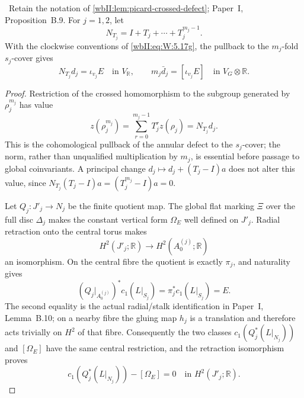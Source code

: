 \begin{lemma}
\label{wbII:lem:picard-finite-norm}
\ Retain the notation of
\cref{wbII:lem:picard-crossed-defect}; Paper~I, Proposition~B.9.  For
$j=1,2$, let
\[
 N_{T_j}=I+T_j+\cdots+T_j^{m_j-1}.
\]
With the clockwise conventions of \eqref{wbII:eq:W:5.17g}, the pullback to the
$m_j$-fold $s_j$-cover gives
\[
 N_{T_j}d_j=\iota_{v_j}E
 \quad\text{in }V_{\mathbb R},
\qquad
 m_j\bar d_j=[\iota_{v_j}E]
 \quad\text{in }V_G\otimes\mathbb R.
\tag{W.28}\label{wbII:eq:W:5.17k}
\]
\end{lemma}

\begin{proof}
Restriction of the crossed homomorphism to the subgroup generated by
$\rho_j^{m_j}$ has value
\[
 z(\rho_j^{m_j})
 =\sum_{r=0}^{m_j-1}T_j^rz(\rho_j)=N_{T_j}d_j.
\tag{W.29}\label{wbII:eq:W:5.17l}
\]
This is the cohomological pullback of the annular defect to the
$s_j$-cover; the norm, rather than unqualified multiplication by $m_j$, is
essential before passage to global coinvariants.  A principal change
$d_j\mapsto d_j+(T_j-I)a$ does not alter this value, since
$N_{T_j}(T_j-I)a=(T_j^{m_j}-I)a=0$.

Let $Q_j:J'_j\to N_j$ be the finite quotient map.  The global flat marking
$\Xi$ over the full disc $\Delta_j$ makes the constant vertical form
$\Omega_E$ well defined on $J'_j$.  Radial retraction onto the central
torus makes
\[
 H^2(J'_j;\mathbb R)\longrightarrow H^2(A_0^{(j)};\mathbb R)
\]
an isomorphism.  On the central fibre the quotient is exactly $\pi_j$, and
naturality gives
\[
 (Q_j|_{A_0^{(j)}})^*c_1(L|_{S_j})
 =\pi_j^*c_1(L|_{S_j})=E.
\tag{W.30}\label{wbII:eq:W:5.17l'}
\]
The second equality is the actual radial/stalk identification in
Paper~I, Lemma~B.10; on a nearby fibre the gluing map $h_j$
is a translation and therefore acts trivially on $H^2$ of that fibre.
Consequently the two classes
$c_1(Q_j^*(L|_{N_j}))$ and $[\Omega_E]$ have the same central restriction,
and the retraction isomorphism proves
\[
 c_1(Q_j^*(L|_{N_j}))-[\Omega_E]=0
 \quad\text{in }H^2(J'_j;\mathbb R).
\tag{W.31}\label{wbII:eq:W:5.17l''}
\]


\end{proof}
